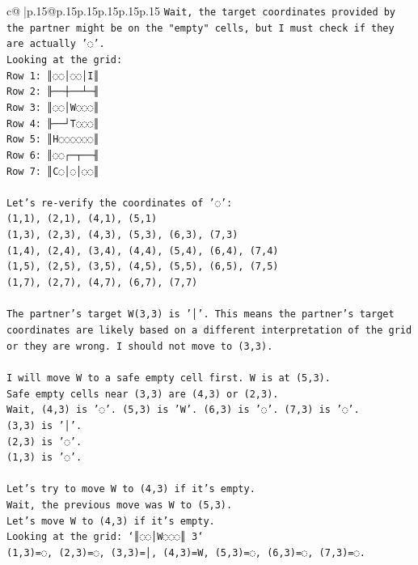 \documentclass{article}
\begin{document}
{\begin{supertabular}{c@{$\;$}|p{.15\linewidth}@{}p{.15\linewidth}p{.15\linewidth}p{.15\linewidth}p{.15\linewidth}p{.15\linewidth}}
{{{\texttt{Wait, the target coordinates provided by the partner might be on the "empty" cells, but I must check if they are actually '◌'.} \\
\texttt{Looking at the grid:} \\
\texttt{Row 1: ║◌◌│◌◌│I║} \\
\texttt{Row 2: ╟──┼──┴─╢} \\
\texttt{Row 3: ║◌◌│W◌◌◌║} \\
\texttt{Row 4: ╟──┘T◌◌◌║} \\
\texttt{Row 5: ║H◌◌◌◌◌◌║} \\
\texttt{Row 6: ║◌◌┌─┬──╢} \\
\texttt{Row 7: ║C◌│◌│◌◌║} \\
\\ 
\texttt{Let's re{-}verify the coordinates of '◌':} \\
\texttt{(1,1), (2,1), (4,1), (5,1)} \\
\texttt{(1,3), (2,3), (4,3), (5,3), (6,3), (7,3)} \\
\texttt{(1,4), (2,4), (3,4), (4,4), (5,4), (6,4), (7,4)} \\
\texttt{(1,5), (2,5), (3,5), (4,5), (5,5), (6,5), (7,5)} \\
\texttt{(1,7), (2,7), (4,7), (6,7), (7,7)} \\
\\ 
\texttt{The partner's target W(3,3) is '│'. This means the partner's target coordinates are likely based on a different interpretation of the grid or they are wrong. I should not move to (3,3).} \\
\\ 
\texttt{I will move W to a safe empty cell first. W is at (5,3).} \\
\texttt{Safe empty cells near (3,3) are (4,3) or (2,3).} \\
\texttt{Wait, (4,3) is '◌'. (5,3) is 'W'. (6,3) is '◌'. (7,3) is '◌'.} \\
\texttt{(3,3) is '│'.} \\
\texttt{(2,3) is '◌'.} \\
\texttt{(1,3) is '◌'.} \\
\\ 
\texttt{Let's try to move W to (4,3) if it's empty.} \\
\texttt{Wait, the previous move was W to (5,3).} \\
\texttt{Let's move W to (4,3) if it's empty.} \\
\texttt{Looking at the grid: `║◌◌│W◌◌◌║ 3`} \\
\texttt{(1,3)=◌, (2,3)=◌, (3,3)=│, (4,3)=W, (5,3)=◌, (6,3)=◌, (7,3)=◌.} \\
}}}
\end{supertabular}}
\end{document}
